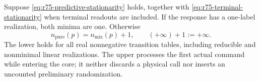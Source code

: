 \begin{theorem}
\label{thm:r75-stationary-initializer}
Suppose \eqref{eq:r75-predictive-stationarity} holds, together with
\eqref{eq:r75-terminal-stationarity} when terminal readouts are included.
If the response has
a one-label realization, both minima are one.  Otherwise
\begin{equation}\label{eq:r75-initialization-law}
 n_{\mathrm{pure}}(p)=n_{\mathrm{mix}}(p)+1,
 \qquad (+\infty)+1:=+\infty.
\end{equation}
The lower holds for all real nonnegative transition tables, including
reducible and nonminimal linear realizations.  The upper processes the
first actual command while entering the core; it neither discards a
physical call nor inserts an uncounted preliminary randomization.
\end{theorem}
